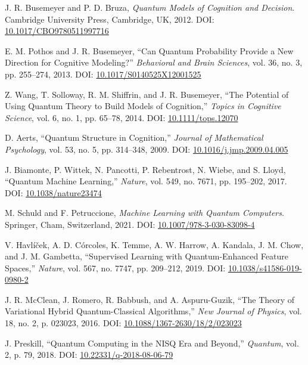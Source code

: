 \documentclass[11pt,letterpaper]{article}
\begin{document}
\begin{thebibliography}{99}
J. R. Busemeyer and P. D. Bruza,
\textit{Quantum Models of Cognition and Decision}.
Cambridge University Press, Cambridge, UK, 2012.
DOI: \href{https://doi.org/10.1017/CBO9780511997716}{10.1017/CBO9780511997716}

E. M. Pothos and J. R. Busemeyer,
``Can Quantum Probability Provide a New Direction for Cognitive Modeling?''
\textit{Behavioral and Brain Sciences}, vol. 36, no. 3, pp. 255--274, 2013.
DOI: \href{https://doi.org/10.1017/S0140525X12001525}{10.1017/S0140525X12001525}

Z. Wang, T. Solloway, R. M. Shiffrin, and J. R. Busemeyer,
``The Potential of Using Quantum Theory to Build Models of Cognition,''
\textit{Topics in Cognitive Science}, vol. 6, no. 1, pp. 65--78, 2014.
DOI: \href{https://doi.org/10.1111/tops.12070}{10.1111/tops.12070}

D. Aerts,
``Quantum Structure in Cognition,''
\textit{Journal of Mathematical Psychology}, vol. 53, no. 5, pp. 314--348, 2009.
DOI: \href{https://doi.org/10.1016/j.jmp.2009.04.005}{10.1016/j.jmp.2009.04.005}

J. Biamonte, P. Wittek, N. Pancotti, P. Rebentrost, N. Wiebe, and S. Lloyd,
``Quantum Machine Learning,''
\textit{Nature}, vol. 549, no. 7671, pp. 195--202, 2017.
DOI: \href{https://doi.org/10.1038/nature23474}{10.1038/nature23474}

M. Schuld and F. Petruccione,
\textit{Machine Learning with Quantum Computers}.
Springer, Cham, Switzerland, 2021.
DOI: \href{https://doi.org/10.1007/978-3-030-83098-4}{10.1007/978-3-030-83098-4}

V. Havlíček, A. D. Córcoles, K. Temme, A. W. Harrow, A. Kandala, J. M. Chow, and J. M. Gambetta,
``Supervised Learning with Quantum-Enhanced Feature Spaces,''
\textit{Nature}, vol. 567, no. 7747, pp. 209--212, 2019.
DOI: \href{https://doi.org/10.1038/s41586-019-0980-2}{10.1038/s41586-019-0980-2}

J. R. McClean, J. Romero, R. Babbush, and A. Aspuru-Guzik,
``The Theory of Variational Hybrid Quantum-Classical Algorithms,''
\textit{New Journal of Physics}, vol. 18, no. 2, p. 023023, 2016.
DOI: \href{https://doi.org/10.1088/1367-2630/18/2/023023}{10.1088/1367-2630/18/2/023023}

J. Preskill,
``Quantum Computing in the NISQ Era and Beyond,''
\textit{Quantum}, vol. 2, p. 79, 2018.
DOI: \href{https://doi.org/10.22331/q-2018-08-06-79}{10.22331/q-2018-08-06-79}


\end{thebibliography}
\end{document}
